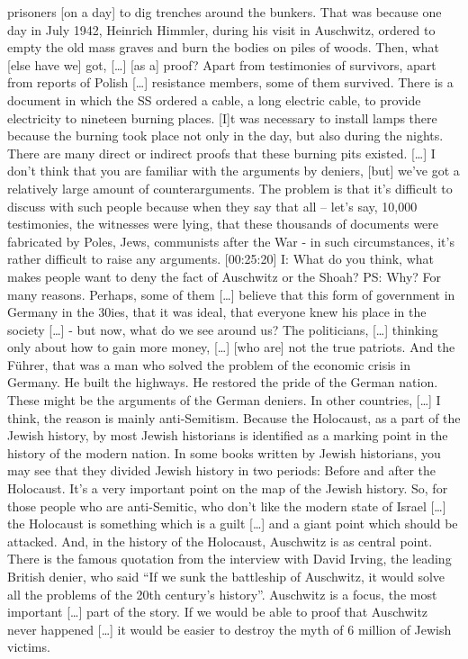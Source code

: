 prisoners [on a day] to dig trenches around the bunkers. That was because one day in July 1942, Heinrich Himmler, during his visit in Auschwitz, ordered to empty the old mass graves and burn the bodies on piles of woods. 
Then, what [else have we] got, […] [as a] proof? Apart from testimonies of survivors, apart from reports of Polish […] resistance members, some of them survived. There is a document in which the SS ordered a cable, a long electric cable, to provide electricity to nineteen burning places. [I]t was necessary to install lamps there because the burning took place not only in the day, but also during the nights. There are many direct or indirect proofs that these burning pits existed. […] I don’t think that you are familiar with the arguments by deniers, [but] we’ve got a relatively large amount of counterarguments. The problem is that it’s difficult to discuss with such people because when they say that all – let’s say, 10,000 testimonies, the witnesses were lying, that these thousands of documents were fabricated by Poles, Jews, communists after the War - in such circumstances, it’s rather difficult to raise any arguments. [00:25:20]
I: What do you think, what makes people want to deny the fact of Auschwitz or the Shoah?
PS: Why? For many reasons. Perhaps, some of them […] believe that this form of government in Germany in the 30ies, that it was ideal, that everyone knew his place in the society […] - but now, what do we see around us? The politicians, […] thinking only about how to gain more money, […] [who are] not the true patriots. And the Führer, that was a man who solved the problem of the economic crisis in Germany. He built the highways. He restored the pride of the German nation. These might be the arguments of the German deniers. In other countries, […] I think, the reason is mainly anti-Semitism. Because the Holocaust, as a part of the Jewish history, by most Jewish historians is identified as a marking point in the history of the modern nation. In some books written by Jewish historians, you may see that they divided Jewish history in two periods: Before and after the Holocaust. It’s a very important point on the map of the Jewish history. So, for those people who are anti-Semitic, who don’t like the modern state of Israel […] the Holocaust is something which is a guilt […] and a giant point which should be attacked. And, in the history of the Holocaust, Auschwitz is as central point. There is the famous quotation from the interview with David Irving, the leading British denier, who said “If we sunk the battleship of Auschwitz, it would solve all the problems of the 20th century’s history”. Auschwitz is a focus, the most important […] part of the story. If we would be able to proof that Auschwitz never happened […] it would be easier to destroy the myth of 6 million of Jewish victims.
